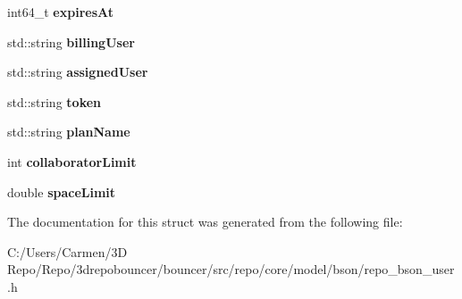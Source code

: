 \begin{DoxyCompactItemize}
\item 
\hypertarget{structrepo_1_1core_1_1model_1_1_repo_user_1_1_subscription_info_aa66adfab18bf4877f2ed098eab9429a8}{}int64\+\_\+t {\bfseries expires\+At}\label{structrepo_1_1core_1_1model_1_1_repo_user_1_1_subscription_info_aa66adfab18bf4877f2ed098eab9429a8}

\item 
\hypertarget{structrepo_1_1core_1_1model_1_1_repo_user_1_1_subscription_info_a959cee5f9786a28ee2ae49fcc54b6456}{}std\+::string {\bfseries billing\+User}\label{structrepo_1_1core_1_1model_1_1_repo_user_1_1_subscription_info_a959cee5f9786a28ee2ae49fcc54b6456}

\item 
\hypertarget{structrepo_1_1core_1_1model_1_1_repo_user_1_1_subscription_info_a0f2d5281cf1b58b5100aefc66c7da49f}{}std\+::string {\bfseries assigned\+User}\label{structrepo_1_1core_1_1model_1_1_repo_user_1_1_subscription_info_a0f2d5281cf1b58b5100aefc66c7da49f}

\item 
\hypertarget{structrepo_1_1core_1_1model_1_1_repo_user_1_1_subscription_info_a80c4c8cd61941656032aed8abf715918}{}std\+::string {\bfseries token}\label{structrepo_1_1core_1_1model_1_1_repo_user_1_1_subscription_info_a80c4c8cd61941656032aed8abf715918}

\item 
\hypertarget{structrepo_1_1core_1_1model_1_1_repo_user_1_1_subscription_info_a01d5533067ec169ca0aca55ee3ed225a}{}std\+::string {\bfseries plan\+Name}\label{structrepo_1_1core_1_1model_1_1_repo_user_1_1_subscription_info_a01d5533067ec169ca0aca55ee3ed225a}

\item 
\hypertarget{structrepo_1_1core_1_1model_1_1_repo_user_1_1_subscription_info_ad8c4de93c11214c1bf04f7206278d68a}{}int {\bfseries collaborator\+Limit}\label{structrepo_1_1core_1_1model_1_1_repo_user_1_1_subscription_info_ad8c4de93c11214c1bf04f7206278d68a}

\item 
\hypertarget{structrepo_1_1core_1_1model_1_1_repo_user_1_1_subscription_info_a1e448d2efc99deb7bfe883aef9a90f3e}{}double {\bfseries space\+Limit}\label{structrepo_1_1core_1_1model_1_1_repo_user_1_1_subscription_info_a1e448d2efc99deb7bfe883aef9a90f3e}

\end{DoxyCompactItemize}


The documentation for this struct was generated from the following file\+:\begin{DoxyCompactItemize}
\item 
C\+:/\+Users/\+Carmen/3\+D Repo/\+Repo/3drepobouncer/bouncer/src/repo/core/model/bson/repo\+\_\+bson\+\_\+user.\+h\end{DoxyCompactItemize}
